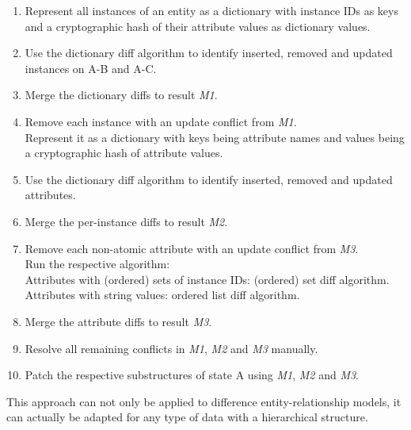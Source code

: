 \begin{enumerate}
\item Represent all instances of an entity as a dictionary with instance IDs as keys and a cryptographic hash of their attribute values as dictionary values.
\item Use the dictionary diff algorithm to identify inserted, removed and updated instances on A-B and A-C.
\item Merge the dictionary diffs to result \emph{M1}.
\item Remove each instance with an update conflict from \emph{M1}.\\
Represent it as a dictionary with keys being attribute names and values being a cryptographic hash of attribute values.
\item Use the dictionary diff algorithm to identify inserted, removed and updated attributes.
\item Merge the per-instance diffs to result \emph{M2}.
\item Remove each non-atomic attribute with an update conflict from \emph{M3}.\\
Run the respective algorithm:\\
Attributes with (ordered) sets of instance IDs: (ordered) set diff algorithm.\\
Attributes with string values: ordered list diff algorithm.
\item Merge the attribute diffs to result \emph{M3}.
\item Resolve all remaining conflicts in \emph{M1}, \emph{M2} and \emph{M3} manually.
\item Patch the respective substructures of state A using \emph{M1}, \emph{M2} and \emph{M3}.
\end{enumerate}

This approach can not only be applied to difference entity-relationship models, it can actually be adapted for any type of data with a hierarchical structure.
